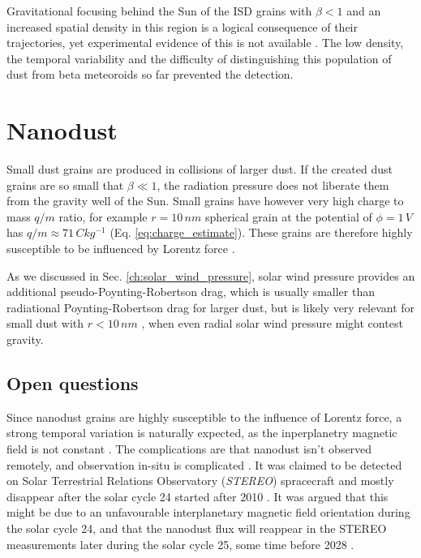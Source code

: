 Gravitational focusing behind the Sun of the ISD grains with $\beta < 1$ and an increased spatial density in this region is a logical consequence of their trajectories, yet experimental evidence of this is not available \citep{mann2010interstellar}. The low density, the temporal variability and the difficulty of distinguishing this population of dust from beta meteoroids so far prevented the detection.

\section{Nanodust}

Small dust grains are produced in collisions of larger dust. If the created dust grains are so small that $\beta \ll 1$, the radiation pressure does not liberate them from the gravity well of the Sun. Small grains have however very high charge to mass $q/m$ ratio, for example $r = 10 \, \si{nm}$ spherical grain at the potential of $\phi = 1 \, \si{V}$ has $q/m \approx 71 \, \si{Ckg^{-1}}$ (Eq. \ref{eq:charge_estimate}). These grains are therefore highly susceptible to be influenced by Lorentz force \citep{czechowski2010formation}. 

As we discussed in Sec. \ref{ch:solar_wind_pressure}, solar wind pressure provides an additional pseudo-Poynting-Robertson drag, which is usually smaller than radiational Poynting-Robertson drag for larger dust, but is likely very relevant for small dust with $r<10\, \si{nm}$ \citep{mukai1982solar}, when even radial solar wind pressure might contest gravity.

\subsection{Open questions}

Since nanodust grains are highly susceptible to the influence of Lorentz force, a strong temporal variation is naturally expected, as the inperplanetry magnetic field is not constant \citep{poppe2020effects}. The complications are that nanodust isn't observed remotely, and observation in-situ is complicated \citep{pantellini2012nano,kellogg2016dust,kellogg2017note}. It was claimed to be detected on Solar Terrestrial Relations Observatory (\textit{STEREO}) spracecraft \citep{meyer2009dust} and mostly disappear after the solar cycle 24 started after 2010 \citep{zaslavsky2012interplanetary}. It was argued that this might be due to an unfavourable interplanetary magnetic field orientation during the solar cycle 24, and that the nanodust flux will reappear in the STEREO measurements later during the solar cycle 25, some time before 2028 \citep{poppe2022effects}.

